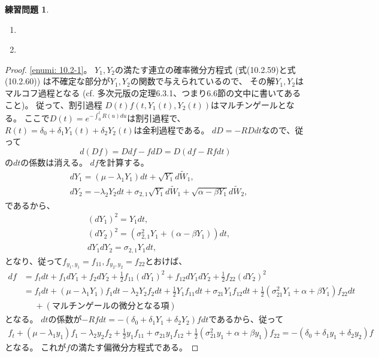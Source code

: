 \documentclass[uplatex]{jsarticle}
\theoremstyle{definition}
\newtheorem{prob}[prob]{練習問題}
\begin{document}
\begin{prob}\label{prob: 10.2}
  \begin{enumerate}
    \item \label{enumi: 10.2-1}
    \item \label{enumi: 10.2-2}
  \end{enumerate}
\end{prob}

\begin{proof}
  \ref{enumi: 10.2-1}。
  \(Y_1,Y_2\)の満たす連立の確率微分方程式
  (式(10.2.59)と式(10.2.60))
  は不確定な部分が\(Y_1,Y_2\)の関数で与えられているので、
  その解\(Y_1,Y_2\)はマルコフ過程となる
  (cf. 多次元版の定理6.3.1、つまり6.6節の文中に書いてあること)。
  従って、割引過程
  \(D(t)f(t,Y_1(t),Y_2(t))\)はマルチンゲールとなる。
  ここで\(D(t) = e^{-\int_0^tR(u)du}\)は割引過程で、
  \(R(t) = \delta_0+\delta_1Y_1(t)+\delta_2Y_2(t)\)は金利過程である。
  \(dD = -RDdt\)なので、従って
  \[
  d(Df) = Ddf - fdD = D (df-Rfdt)
  \]
  の\(dt\)の係数は消える。
  \(df\)を計算する。
  \begin{align*}
    &dY_1 = (\mu - \lambda_1 Y_1)dt + \sqrt{Y_1}d\tilde{W}_1, \\
    &dY_2 = -\lambda_2Y_2dt + \sigma_{2,1}\sqrt{Y_1}d\tilde{W}_1
    + \sqrt{\alpha-\beta Y_1}d\tilde{W}_2,
  \end{align*}
  であるから、
  \begin{align*}
    &(dY_1)^2 = Y_1dt, \\
    &(dY_2)^2 = \left( \sigma_{2,1}^2Y_1 + (\alpha-\beta Y_1)\right) dt, \\
    &dY_1dY_2 = \sigma_{2,1}Y_1dt,
  \end{align*}
  となり、従って\(f_{y_1,y_1}=f_{11},f_{y_2,y_2}=f_{22}\)とおけば、
  \begin{align*}
    df
    &= f_tdt + f_1dY_1 + f_2dY_2
    + \frac{1}{2}f_{11}(dY_1)^2
    + f_{12}dY_1dY_2
    + \frac{1}{2}f_{22}(dY_2)^2 \\
    &= f_tdt + (\mu-\lambda_1 Y_1)f_1dt - \lambda_2Y_2f_2dt
    + \frac{1}{2}Y_1f_{11}dt
    + \sigma_{21}Y_1f_{12}dt
    + \frac{1}{2}(\sigma_{21}^2Y_1 + \alpha + \beta Y_1)f_{22}dt \\
    &\ \ \ \ \ \
    + (\text{マルチンゲールの微分となる項})
  \end{align*}
  となる。
  \(dt\)の係数が\(-Rfdt=-(\delta_0+\delta_1Y_1+\delta_2Y_2)fdt\)であるから、従って
  \begin{align*}
    f_t + (\mu-\lambda_1 y_1)f_1 - \lambda_2y_2f_2
    + \frac{1}{2}y_1f_{11}
    + \sigma_{21}y_1f_{12}
    + \frac{1}{2}(\sigma_{21}^2y_1 + \alpha + \beta y_1)f_{22}
    = -(\delta_0+\delta_1y_1+\delta_2y_2)f
  \end{align*}
  となる。
  これが\(f\)の満たす偏微分方程式である。


\end{proof}
\end{document}

